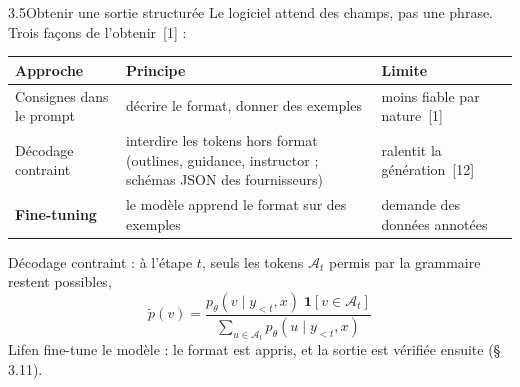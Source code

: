 \documentclass[11pt,aspectratio=169]{beamer}
\newcommand{\refs}[1]{{\color{mlblue}[#1]}}
\begin{document}
\begin{frame}{3.5\quad Obtenir une sortie structurée}
  \small
  Le logiciel attend des champs, pas une phrase. Trois façons de l'obtenir~\refs{1} :

  \vspace{0.3em}
  \begin{center}
    \renewcommand{\arraystretch}{1.25}
    \begin{tabular}{@{}L{3.0cm}L{5.4cm}L{4.4cm}@{}}
      \toprule
      \textbf{Approche} & \textbf{Principe} & \textbf{Limite} \\
      \midrule
      Consignes dans le prompt & décrire le format, donner des exemples & moins fiable par
        nature~\refs{1} \\
      Décodage contraint & interdire les tokens hors format (outlines, guidance, instructor ;
        schémas JSON des fournisseurs) & ralentit la génération~\refs{12} \\
      \textbf{Fine-tuning} & le modèle apprend le format sur des exemples & demande des
        données annotées \\
      \bottomrule
    \end{tabular}
  \end{center}

  \vspace{0.2em}
  Décodage contraint : à l'étape $t$, seuls les tokens $\mathcal{A}_t$ permis par la grammaire
  restent possibles,
  \[
    \tilde p(v) = \frac{p_\theta(v \mid y_{<t}, x)\; \mathbf{1}[v \in \mathcal{A}_t]}
                       {\sum_{u \in \mathcal{A}_t} p_\theta(u \mid y_{<t}, x)}
  \]
  Lifen fine-tune le modèle : le format est appris, et la sortie est vérifiée ensuite
  (§\,3.11).
\end{frame}
\end{document}
